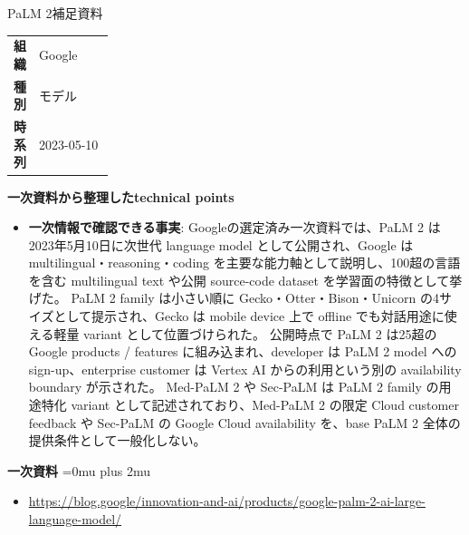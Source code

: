 \begin{technicalnote}{PaLM 2}{補足資料}
\begingroup
\begin{tabularx}{\linewidth}{@{}>{\bfseries}p{0.22\linewidth}X@{}}
組織 & Google \\
種別 & モデル \\
時系列 & 2023-05-10 \\
\end{tabularx}
\smallskip
{\bfseries 一次資料から整理したtechnical points}
\begin{itemize}[leftmargin=1.5em,itemsep=0.35em]
\item \textbf{一次情報で確認できる事実}: Googleの選定済み一次資料では、PaLM 2 は2023年5月10日に次世代 language model として公開され、Google は multilingual・reasoning・coding を主要な能力軸として説明し、100超の言語を含む multilingual text や公開 source-code dataset を学習面の特徴として挙げた。 PaLM 2 family は小さい順に Gecko・Otter・Bison・Unicorn の4サイズとして提示され、Gecko は mobile device 上で offline でも対話用途に使える軽量 variant として位置づけられた。 公開時点で PaLM 2 は25超の Google products / features に組み込まれ、developer は PaLM 2 model への sign-up、enterprise customer は Vertex AI からの利用という別の availability boundary が示された。 Med-PaLM 2 や Sec-PaLM は PaLM 2 family の用途特化 variant として記述されており、Med-PaLM 2 の限定 Cloud customer feedback や Sec-PaLM の Google Cloud availability を、base PaLM 2 全体の提供条件として一般化しない。
\end{itemize}
\begin{minipage}{\linewidth}
\begin{samepage}
{\bfseries 一次資料}
\begingroup\sloppy
\Urlmuskip=0mu plus 2mu\relax
\begin{itemize}[leftmargin=1.5em,itemsep=0.25em]
\item {\scriptsize\url{https://blog.google/innovation-and-ai/products/google-palm-2-ai-large-language-model/}}
\end{itemize}
\endgroup
\end{samepage}
\end{minipage}
\endgroup
\end{technicalnote}
\medskip

